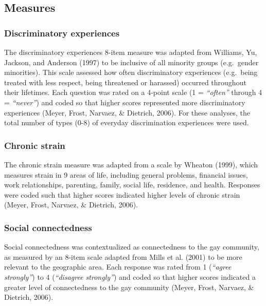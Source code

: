 \documentclass[
  english,
  man,floatsintext]{apa6}
\begin{document}
\hypertarget{measures}{%
\subsection{Measures}\label{measures}}

\hypertarget{discriminatory-experiences}{%
\subsubsection{Discriminatory experiences}\label{discriminatory-experiences}}

The discriminatory experiences 8-item measure was adapted from Williams, Yu, Jackson, and Anderson (1997) to be inclusive of all minority groups (e.g.~gender minorities). This scale assessed how often discriminatory experiences (e.g.~being treated with less respect, being threatened or harassed) occurred throughout their lifetimes. Each question was rated on a 4-point scale (1 = \emph{``often''} through 4 = \emph{``never''}) and coded so that higher scores represented more discriminatory experiences (Meyer, Frost, Narvaez, \& Dietrich, 2006). For these analyses, the total number of types (0-8) of everyday discrimination experiences were used.

\hypertarget{chronic-strain}{%
\subsubsection{Chronic strain}\label{chronic-strain}}

The chronic strain measure was adapted from a scale by Wheaton (1999), which measures strain in 9 areas of life, including general problems, financial issues, work relationships, parenting, family, social life, residence, and health. Responses were coded such that higher scores indicated higher levels of chronic strain (Meyer, Frost, Narvaez, \& Dietrich, 2006).

\hypertarget{social-connectedness}{%
\subsubsection{Social connectedness}\label{social-connectedness}}

Social connectedness was contextualized as connectedness to the gay community, as measured by an 8-item scale adapted from Mills et al. (2001) to be more relevant to the geographic area. Each response was rated from 1 (\emph{``agree strongly''}) to 4 (\emph{``disagree strongly''}) and coded so that higher scores indicated a greater level of connectedness to the gay community (Meyer, Frost, Narvaez, \& Dietrich, 2006).
\end{document}
